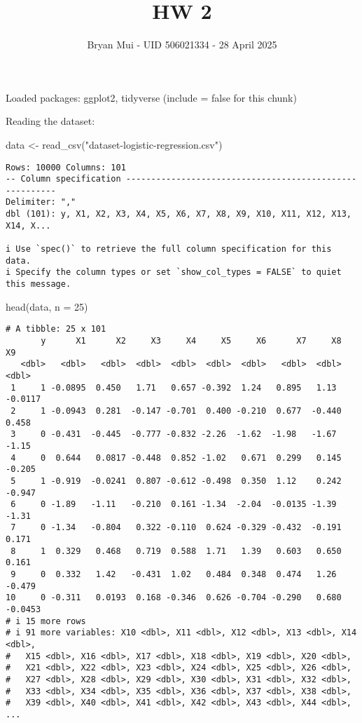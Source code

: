 \documentclass[
  letterpaper,
  DIV=11,
  numbers=noendperiod]{scrartcl}
\title{HW 2}
\author{Bryan Mui - UID 506021334 - 28 April 2025}
\date{}
\newenvironment{Shaded}{\begin{snugshade}}{\end{snugshade}}
\newcommand{\AttributeTok}[1]{\textcolor[rgb]{0.40,0.45,0.13}{#1}}
\newcommand{\DecValTok}[1]{\textcolor[rgb]{0.68,0.00,0.00}{#1}}
\newcommand{\FunctionTok}[1]{\textcolor[rgb]{0.28,0.35,0.67}{#1}}
\newcommand{\NormalTok}[1]{\textcolor[rgb]{0.00,0.23,0.31}{#1}}
\newcommand{\OtherTok}[1]{\textcolor[rgb]{0.00,0.23,0.31}{#1}}
\newcommand{\StringTok}[1]{\textcolor[rgb]{0.13,0.47,0.30}{#1}}
\begin{document}
\maketitle


Loaded packages: ggplot2, tidyverse (include = false for this chunk)

Reading the dataset:

\begin{Shaded}
\begin{Highlighting}[]
\NormalTok{data }\OtherTok{\textless{}{-}} \FunctionTok{read\_csv}\NormalTok{(}\StringTok{"dataset{-}logistic{-}regression.csv"}\NormalTok{)}
\end{Highlighting}
\end{Shaded}

\begin{verbatim}
Rows: 10000 Columns: 101
-- Column specification --------------------------------------------------------
Delimiter: ","
dbl (101): y, X1, X2, X3, X4, X5, X6, X7, X8, X9, X10, X11, X12, X13, X14, X...

i Use `spec()` to retrieve the full column specification for this data.
i Specify the column types or set `show_col_types = FALSE` to quiet this message.
\end{verbatim}

\begin{Shaded}
\begin{Highlighting}[]
\FunctionTok{head}\NormalTok{(data, }\AttributeTok{n =} \DecValTok{25}\NormalTok{)}
\end{Highlighting}
\end{Shaded}

\begin{verbatim}
# A tibble: 25 x 101
       y      X1      X2     X3     X4     X5     X6      X7     X8      X9
   <dbl>   <dbl>   <dbl>  <dbl>  <dbl>  <dbl>  <dbl>   <dbl>  <dbl>   <dbl>
 1     1 -0.0895  0.450   1.71   0.657 -0.392  1.24   0.895   1.13  -0.0117
 2     1 -0.0943  0.281  -0.147 -0.701  0.400 -0.210  0.677  -0.440  0.458 
 3     0 -0.431  -0.445  -0.777 -0.832 -2.26  -1.62  -1.98   -1.67  -1.15  
 4     0  0.644   0.0817 -0.448  0.852 -1.02   0.671  0.299   0.145 -0.205 
 5     1 -0.919  -0.0241  0.807 -0.612 -0.498  0.350  1.12    0.242 -0.947 
 6     0 -1.89   -1.11   -0.210  0.161 -1.34  -2.04  -0.0135 -1.39  -1.31  
 7     0 -1.34   -0.804   0.322 -0.110  0.624 -0.329 -0.432  -0.191  0.171 
 8     1  0.329   0.468   0.719  0.588  1.71   1.39   0.603   0.650  0.161 
 9     0  0.332   1.42   -0.431  1.02   0.484  0.348  0.474   1.26  -0.479 
10     0 -0.311   0.0193  0.168 -0.346  0.626 -0.704 -0.290   0.680 -0.0453
# i 15 more rows
# i 91 more variables: X10 <dbl>, X11 <dbl>, X12 <dbl>, X13 <dbl>, X14 <dbl>,
#   X15 <dbl>, X16 <dbl>, X17 <dbl>, X18 <dbl>, X19 <dbl>, X20 <dbl>,
#   X21 <dbl>, X22 <dbl>, X23 <dbl>, X24 <dbl>, X25 <dbl>, X26 <dbl>,
#   X27 <dbl>, X28 <dbl>, X29 <dbl>, X30 <dbl>, X31 <dbl>, X32 <dbl>,
#   X33 <dbl>, X34 <dbl>, X35 <dbl>, X36 <dbl>, X37 <dbl>, X38 <dbl>,
#   X39 <dbl>, X40 <dbl>, X41 <dbl>, X42 <dbl>, X43 <dbl>, X44 <dbl>, ...
\end{verbatim}
\end{document}
